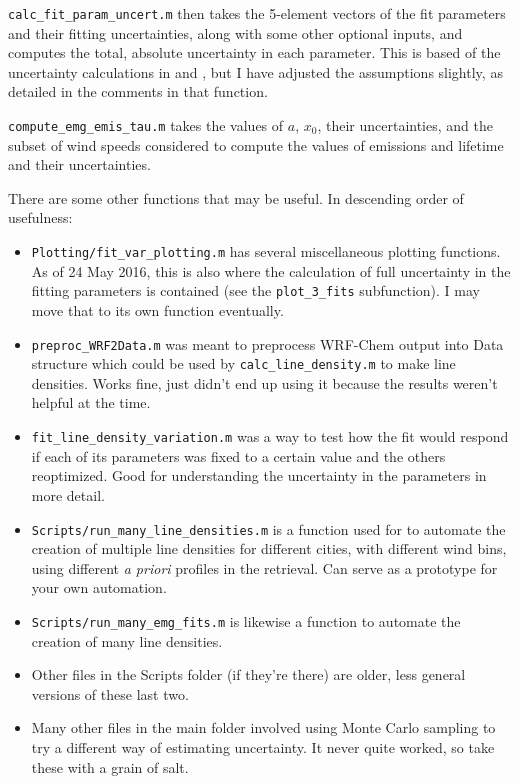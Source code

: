 \documentclass[12pt]{article}
\begin{document}
		\lstinline$calc_fit_param_uncert.m$ then takes the 5-element vectors of the fit parameters and their fitting uncertainties, along with some other optional inputs, and computes the total, absolute uncertainty in each parameter. This is based of the uncertainty calculations in \citet{beirle11} and \citet{lu15}, but I have adjusted the assumptions slightly, as detailed in the comments in that function.
		
		\lstinline$compute_emg_emis_tau.m$ takes the values of $a$, $x_0$, their uncertainties, and the subset of wind speeds considered to compute the values of emissions and lifetime and their uncertainties.
		
		There are some other functions that may be useful. In descending order of usefulness:
		\begin{itemize}
		\item \lstinline$Plotting/fit_var_plotting.m$ has several miscellaneous plotting functions. As of 24 May 2016, this is also where the calculation of full uncertainty in the fitting parameters is contained (see the \lstinline$plot_3_fits$ subfunction). I may move that to its own function eventually.
		
		\item \lstinline$preproc_WRF2Data.m$ was meant to preprocess WRF-Chem output into Data structure which could be used by \lstinline$calc_line_density.m$ to make line densities. Works fine, just didn't end up using it because the results weren't helpful at the time.
		
		\item \lstinline$fit_line_density_variation.m$ was a way to test how the fit would respond if each of its parameters was fixed to a certain value and the others reoptimized. Good for understanding the uncertainty in the parameters in more detail.
		
		\item \lstinline$Scripts/run_many_line_densities.m$ is a function used for \citet{laughner16} to automate the creation of multiple line densities for different cities, with different wind bins, using different \emph{a priori} profiles in the retrieval. Can serve as a prototype for your own automation.
		
		\item \lstinline$Scripts/run_many_emg_fits.m$ is likewise a function to automate the creation of many line densities.
		
		\item Other files in the Scripts folder (if they're there) are older, less general versions of these last two.
		
		\item Many other files in the main  folder involved using Monte Carlo sampling to try a different way of estimating uncertainty. It never quite worked, so take these with a grain of salt.		
		\end{itemize}
		
\end{document}
